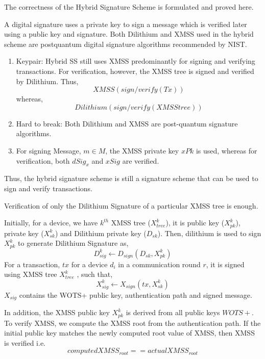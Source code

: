 \documentclass[lettersize,journal]{IEEEtran}
\begin{document}
\begin{prop}[Correctness]
The correctness of the Hybrid Signature Scheme is formulated and proved here.
\end{prop}
A digital signature uses a private key to sign a message which is verified later using a public key and signature.
Both Dilithium and XMSS used in the hybrid scheme are postquantum digital signature algorithms recommended by NIST.
\begin{enumerate}
    \item Keypair: Hybrid SS still uses XMSS predominantly for signing and verifying transactions. 
    For verification, however, the XMSS tree is signed and verified by Dilithium. 
    Thus, 
    $$XMSS(sign/verify(Tx))$$ whereas, 
    $$Dilithium(sign/verify(XMSStree))$$
    \item Hard to break: Both Dilithium and XMSS are post-quantum signature algorithms.
    \item For signing Message, $m\in M$, the XMSS private key $xPk$ is used, whereas for verification, both $dSig_x$ and $xSig$ are verified.
\end{enumerate}
Thus, the hybrid signature scheme is still a signature scheme that can be
used to sign and verify transactions.

\begin{prop} \label{prop:dilithium_enough}
Verification of only the Dilithium Signature of a particular XMSS tree is enough.
\end{prop}
Initially, for a device, we have $k^{th}$ XMSS tree ($X_{tree}^k$), it is public key ($X_{pk}^k$), private key ($X_{sk}^k$) and Dilithium private key ($D_{sk}$).
Then, dilithium is used to sign $X_{pk}^k$ to generate Dilithium Signature as, 
$$D_{sig}^k \leftarrow D_{sign}(D_{sk}, X_{pk}^{k})$$
For a transaction, $tx$ for a device $d_i$ in a communication round $r$, 
it is signed using XMSS tree $X_{tree}^k$ , such that, 
$$ X_{sig}^k \leftarrow X_{sign}(tx, X_{sk}^k)$$
$X_{sig}$ contains the WOTS+ public key, authentication path and signed message.

In addition, the XMSS public key $X_{pk}^k$ is derived from all public keys $WOTS+$.
To verify XMSS, we compute the XMSS root from the authentication path. 
If the initial public key matches the newly computed root value of XMSS, then XMSS is verified i.e.
$$computedXMSS_{root} == actualXMSS_{root}$$
\end{document}
